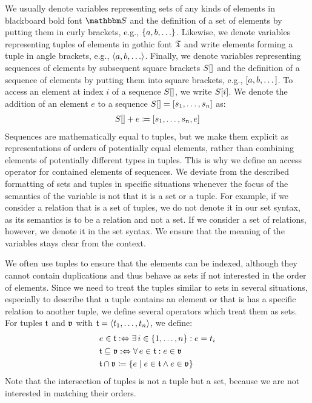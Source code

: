 We usually denote variables representing sets of any kinds of elements in blackboard bold font $\set{S}{}$ and the definition of a set of elements by putting them in curly brackets, e.g., $\setted{a, b, \dots}$.
Likewise, we denote variables representing tuples of elements in gothic font $\mathfrak{T}{}$ and write elements forming a tuple in angle brackets, e.g., $\tupled{a, b, \dots}$.
Finally, we denote variables representing sequences of elements by subsequent square brackets $S[]$ and the definition of a sequence of elements by putting them into square brackets, e.g., $[a, b, \dots]$.
To access an element at index $i$ of a sequence $S[]$, we write $S[i]$.
We denote the addition of an element $e$ to a sequence $S[] = [s_1, \dots, s_n]$ as:
\begin{align*}
    S[] + e \coloneqq [s_1, \dots, s_n, e]
\end{align*}
Sequences are mathematically equal to tuples, but we make them explicit as representations of orders of potentially equal elements, rather than combining elements of potentially different types in tuples. This is why we define an access operator for contained elements of sequences.
We deviate from the described formatting of sets and tuples in specific situations whenever the focus of the semantics of the variable is not that it is a set or a tuple.
For example, if we consider a relation that is a set of tuples, we do not denote it in our set syntax, as its semantics is to be a relation and not a set.
If we consider a set of relations, however, we denote it in the set syntax.
We ensure that the meaning of the variables stays clear from the context.

We often use tuples to ensure that the elements can be indexed, although they cannot contain duplications and thus behave as sets if not interested in the order of elements.
Since we need to treat the tuples similar to sets in several situations, especially to describe that a tuple contains an element or that is has a specific relation to another tuple, we define several operators which treat them as sets.
For tuples $\mathfrak{t}$ and $\mathfrak{v}$ with $\mathfrak{t}{} = \langle t_1, \dots, t_n \rangle$, we define:
\begin{align*}
    &
    e \in \tuple{t}{} \equivalentperdefinition \exists i \in \setted{1, \dots, n} : e = t_i \\
    &
    \tuple{t} \subseteq \tuple{v} \equivalentperdefinition \forall e \in \tuple{t} : e \in \tuple{v} \\
    &
    \tuple{t} \cap \tuple{v} \equalsperdefinition \setted{e \mid e \in \tuple{t} \land e \in \tuple{v}}
\end{align*}
Note that the intersection of tuples is not a tuple but a set, because we are not interested in matching their orders.

